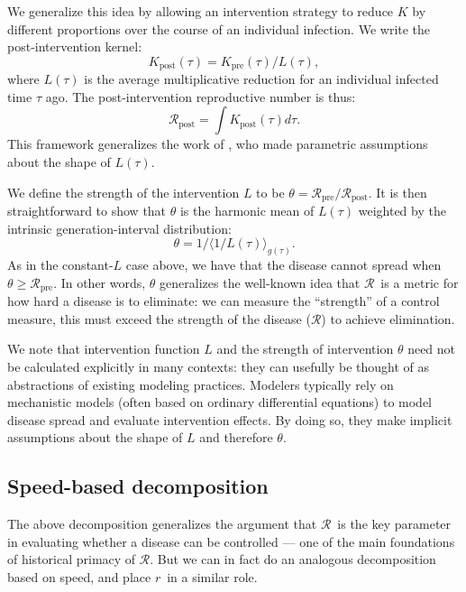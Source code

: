 \documentclass[12pt]{article}
\newcommand{\RR}{\ensuremath{{\mathcal R}}}
\newcommand{\Rx}[1]{\ensuremath{\RR_{\mathrm{#1}}}}
\newcommand{\Rpre}{\Rx{pre}}
\newcommand{\Rpost}{\Rx{post}}
\newcommand{\KK}{\ensuremath{{K}}}
\newcommand{\Kx}[1]{\ensuremath{\KK_{\mathrm{#1}}}}
\newcommand{\Kpre}{\Kx{pre}}
\newcommand{\Kpost}{\Kx{post}}
\newcommand{\rr}{\ensuremath{{r}}}
\newcommand{\eqlab}[1]{\label{eq:#1}}
\begin{document}
We generalize this idea by allowing an intervention strategy to reduce $K$ by different proportions over the course of an individual infection. We write the post-intervention kernel:
\begin{equation}
	\Kpost(\tau) = \Kpre(\tau)/L(\tau), 
\end{equation}
where $L(\tau)$ is the average multiplicative reduction for an individual infected time $\tau$ ago.
The post-intervention reproductive number is thus:
\begin{equation}
	\Rpost = \int \Kpost(\tau) d\tau.
\end{equation}
This framework generalizes the work of \cite{fraser2004factors}, who made parametric assumptions about the shape of $L(\tau)$. 

We define the strength of the intervention $L$ to be $\theta = \Rpre/\Rpost$. 
It is then straightforward to show that $\theta$ is the harmonic mean of $L(\tau)$ weighted by the intrinsic generation-interval distribution:
\begin{equation}
	\theta = 1/\langle 1/L(\tau) \rangle_{g(\tau)}.
	\eqlab{strengthMean}
\end{equation}
As in the constant-$L$ case above, we have that the disease cannot spread when $\theta \geq \Rpre$. 
In other words, $\theta$ generalizes the well-known idea that \RR\ is a metric for how hard a disease is to eliminate: we can measure the ``strength'' of a control measure, this must exceed the strength of the disease (\RR) to achieve elimination.

We note that intervention function $L$ and the strength of intervention $\theta$ need not be calculated explicitly in many contexts: they can usefully be thought of as abstractions of existing modeling practices.
Modelers typically rely on mechanistic models (often based on ordinary differential equations) to model disease spread and evaluate intervention effects.
By doing so, they make implicit assumptions about the shape of $L$ and therefore $\theta$.

\subsection{Speed-based decomposition}

The above decomposition generalizes the argument that \RR\ is the key parameter in evaluating whether a disease can be controlled --- one of the main foundations of historical primacy of \RR. But we can in fact do an analogous decomposition based on speed, and place \rr\ in a similar role.
\end{document}

